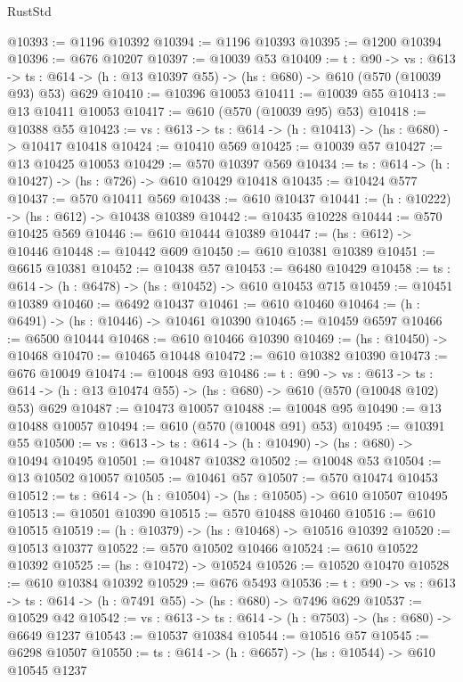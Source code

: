 \begin{lexlean}{RustStd}
\begin{coremodule}
@10393 := @1196 @10392
@10394 := @1196 @10393
@10395 := @1200 @10394
@10396 := @676 @10207
@10397 := @10039 @53
@10409 := {t : @90} ->
  {vs : @613} ->
  {ts : @614} -> (h : @13 @10397 @55) -> (hs : @680) -> @610 (@570 (@10039 @93) @53) @629
@10410 := @10396 @10053
@10411 := @10039 @55
@10413 := @13 @10411 @10053
@10417 := @610 (@570 (@10039 @95) @53)
@10418 := @10388 @55
@10423 := {vs : @613} -> {ts : @614} -> (h : @10413) -> (hs : @680) -> @10417 @10418
@10424 := @10410 @569
@10425 := @10039 @57
@10427 := @13 @10425 @10053
@10429 := @570 @10397 @569
@10434 := {ts : @614} -> (h : @10427) -> (hs : @726) -> @610 @10429 @10418
@10435 := @10424 @577
@10437 := @570 @10411 @569
@10438 := @610 @10437
@10441 := (h : @10222) -> (hs : @612) -> @10438 @10389
@10442 := @10435 @10228
@10444 := @570 @10425 @569
@10446 := @610 @10444 @10389
@10447 := (hs : @612) -> @10446
@10448 := @10442 @609
@10450 := @610 @10381 @10389
@10451 := @6615 @10381
@10452 := @10438 @57
@10453 := @6480 @10429
@10458 := {ts : @614} -> (h : @6478) -> (hs : @10452) -> @610 @10453 @715
@10459 := @10451 @10389
@10460 := @6492 @10437
@10461 := @610 @10460
@10464 := (h : @6491) -> (hs : @10446) -> @10461 @10390
@10465 := @10459 @6597
@10466 := @6500 @10444
@10468 := @610 @10466 @10390
@10469 := (hs : @10450) -> @10468
@10470 := @10465 @10448
@10472 := @610 @10382 @10390
@10473 := @676 @10049
@10474 := @10048 @93
@10486 := {t : @90} ->
  {vs : @613} ->
  {ts : @614} -> (h : @13 @10474 @55) -> (hs : @680) -> @610 (@570 (@10048 @102) @53) @629
@10487 := @10473 @10057
@10488 := @10048 @95
@10490 := @13 @10488 @10057
@10494 := @610 (@570 (@10048 @91) @53)
@10495 := @10391 @55
@10500 := {vs : @613} -> {ts : @614} -> (h : @10490) -> (hs : @680) -> @10494 @10495
@10501 := @10487 @10382
@10502 := @10048 @53
@10504 := @13 @10502 @10057
@10505 := @10461 @57
@10507 := @570 @10474 @10453
@10512 := {ts : @614} -> (h : @10504) -> (hs : @10505) -> @610 @10507 @10495
@10513 := @10501 @10390
@10515 := @570 @10488 @10460
@10516 := @610 @10515
@10519 := (h : @10379) -> (hs : @10468) -> @10516 @10392
@10520 := @10513 @10377
@10522 := @570 @10502 @10466
@10524 := @610 @10522 @10392
@10525 := (hs : @10472) -> @10524
@10526 := @10520 @10470
@10528 := @610 @10384 @10392
@10529 := @676 @5493
@10536 := {t : @90} -> {vs : @613} -> {ts : @614} -> (h : @7491 @55) -> (hs : @680) -> @7496 @629
@10537 := @10529 @42
@10542 := {vs : @613} -> {ts : @614} -> (h : @7503) -> (hs : @680) -> @6649 @1237
@10543 := @10537 @10384
@10544 := @10516 @57
@10545 := @6298 @10507
@10550 := {ts : @614} -> (h : @6657) -> (hs : @10544) -> @610 @10545 @1237

\end{coremodule}
\end{lexlean}
